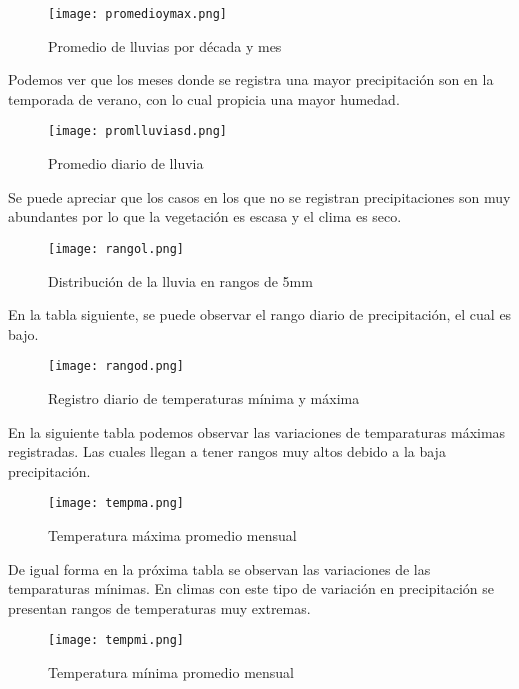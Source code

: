 \documentclass{article}
\begin{document}
\begin{figure}[H]
    \centering
    \texttt{[image: promedioymax.png]} 
    \caption{Promedio de lluvias por década y mes} 
\end{figure} 

Podemos ver que los meses donde se registra una mayor precipitación son en la temporada de verano, con lo cual propicia una mayor humedad. 

\begin{figure}[H]
    \centering
    \texttt{[image: promlluviasd.png]} 
    \caption{Promedio diario de lluvia} 
\end{figure} 

\clearpage

Se puede apreciar que los casos en los que no se registran precipitaciones son muy abundantes por lo que la vegetación es escasa y el clima es seco. 

\begin{figure}[H]
    \centering
    \texttt{[image: rangol.png]} 
    \caption{Distribución de la lluvia en rangos de 5mm} 
\end{figure} 

En la tabla siguiente, se puede observar el rango diario de precipitación, el cual es bajo.

\begin{figure}[H]
    \centering
    \texttt{[image: rangod.png]} 
    \caption{Registro diario de temperaturas mínima y máxima} 
\end{figure} 

\clearpage

En la siguiente tabla podemos observar las variaciones de temparaturas máximas registradas. Las cuales llegan a tener rangos muy altos debido a la baja precipitación. 

\begin{figure}[H]
    \centering
    \texttt{[image: tempma.png]} 
    \caption{Temperatura máxima promedio mensual} 
\end{figure} 

De igual forma en la próxima tabla se observan las variaciones de las temparaturas mínimas. En climas con este tipo de variación en precipitación se presentan rangos de temperaturas muy extremas.

\begin{figure}[H]
    \centering
    \texttt{[image: tempmi.png]} 
    \caption{Temperatura mínima promedio mensual} 
\end{figure}
\end{document}
